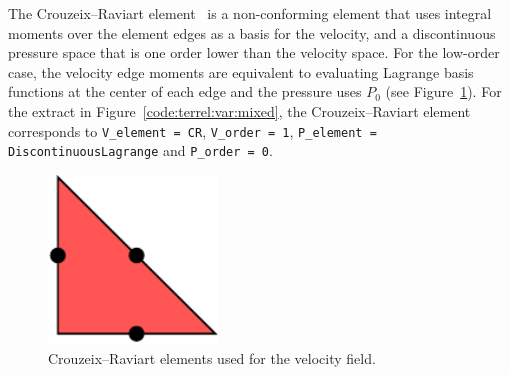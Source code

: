 The Crouzeix--Raviart element~\citep{CrouzeixRaviart1973} is a
non-conforming element that uses integral moments over the element
edges as a basis for the velocity, and a discontinuous pressure space
that is one order lower than the velocity space.  For the low-order case,
the velocity edge moments are equivalent to evaluating Lagrange basis
functions at the center of each edge and the pressure uses $P_0$
(see Figure~\ref{fig:terrel:CRElements}).  For the extract in
Figure~\ref{code:terrel:var:mixed},
the Crouzeix--Raviart element corresponds to
{\tt V\_element = CR}, {\tt V\_order = 1},
{\tt P\_element = DiscontinuousLagrange} and {\tt P\_order = 0}.
%
\begin{figure}
  \center
  \includegraphics[width=0.4\textwidth]{chapters/kirby-6/pdf/CR1.pdf}
  \caption{Crouzeix--Raviart elements used for the velocity field.}
  \label{fig:terrel:CRElements}
\end{figure}

